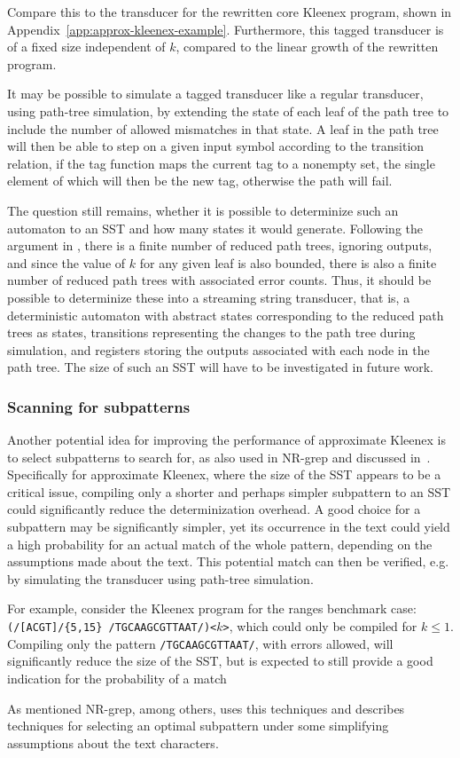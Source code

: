 Compare this to the transducer for the rewritten core Kleenex program, shown in
Appendix~\ref{app:approx-kleenex-example}. Furthermore, this tagged transducer
is of a fixed size independent of $k$, compared to the linear growth of the
rewritten program.

It may be possible to simulate a tagged transducer like a regular transducer,
using path-tree simulation, by extending the state of each leaf of the path
tree to include the number of allowed mismatches in that state. A leaf in the
path tree will then be able to step on a given input symbol according to the
transition relation, if the tag function maps the current tag to a nonempty
set, the single element of which will then be the new tag, otherwise the path
will fail.

The question still remains, whether it is possible to determinize such an
automaton to an SST and how many states it would generate. Following the
argument in \cite{soholm2015ordered}, there is a finite number of reduced path
trees, ignoring outputs, and since the value of $k$ for any given leaf is also
bounded, there is also a finite number of reduced path trees with associated
error counts. Thus, it should be possible to determinize these into a streaming
string transducer, that is, a deterministic automaton with abstract states
corresponding to the reduced path trees as states, transitions representing the
changes to the path tree during simulation, and registers storing the outputs
associated with each node in the path tree. The size of such an SST will have
to be investigated in future work.


\subsubsection{Scanning for subpatterns}

Another potential idea for improving the performance of approximate Kleenex is
to select subpatterns to search for, as also used in NR-grep and discussed
in~\cite{navarro2001nr}. Specifically for approximate Kleenex, where the size
of the SST appears to be a critical issue, compiling only a shorter and perhaps
simpler subpattern to an SST could significantly reduce the determinization
overhead. A good choice for a subpattern may be significantly simpler, yet its
occurrence in the text could yield a high probability for an actual match of
the whole pattern, depending on the assumptions made about the text. This
potential match can then be verified, e.g. by simulating the transducer using
path-tree simulation.

For example, consider the Kleenex program for the ranges benchmark case:
\texttt{(/[ACGT]/\{5,15\} /TGCAAGCGTTAAT/)<$k$>}, which could only be compiled
for $k\leq1$. Compiling only the pattern \texttt{/TGCAAGCGTTAAT/}, with errors
allowed, will significantly reduce the size of the SST, but is expected to
still provide a good indication for the probability of a match

As mentioned NR-grep, among others, uses this techniques and
\cite{navarro2001nr} describes techniques for selecting an optimal subpattern
under some simplifying assumptions about the text characters.


